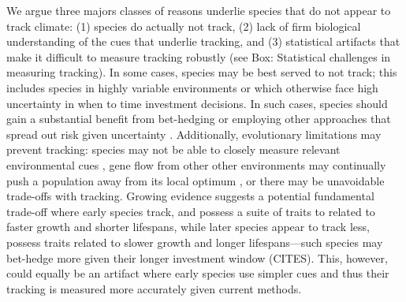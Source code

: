 \documentclass[11pt,letterpaper]{article}
\begin{document}
We argue three majors classes of reasons underlie species that do not appear to track climate: (1) species do actually not track, (2) lack of firm biological understanding of the cues that underlie tracking, and (3) statistical artifacts that make it difficult to measure tracking robustly (see Box: Statistical challenges in measuring tracking). In some cases, species may be best served to not track; this includes species in highly variable environments or which otherwise face high uncertainty in when to time investment decisions. In such cases, species should gain a substantial benefit from bet-hedging or employing other approaches that spread out risk given uncertainty \citep{Venable:2007os,donald2013}. Additionally, evolutionary limitations may prevent tracking: species may not be able to closely measure relevant environmental cues \citep{arnold1992,Singer:2010eb}, gene flow from other other environments may continually push a population away from its local optimum \citep{lenormand2002}, or there may be unavoidable trade-offs \citep{levins1968} with tracking.  Growing evidence suggests a potential fundamental trade-off where early species track, and possess a suite of traits to related to faster growth and shorter lifespans, while later species appear to track less, possess traits related to slower growth and longer lifespans---such species may bet-hedge more given their longer investment window (CITES). This, however, could equally be an artifact where early species use simpler cues and thus their tracking is measured more accurately given current methods. 
\end{document}
